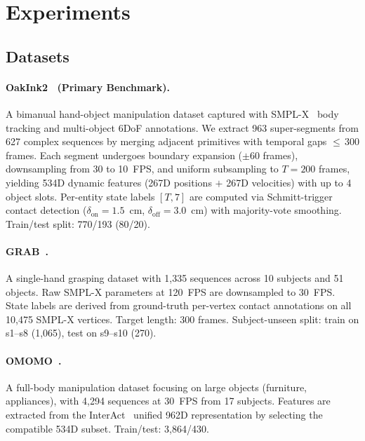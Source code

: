 \section{Experiments}
\label{sec:experiments}

\subsection{Datasets}
\label{sec:datasets}

\paragraph{OakInk2~\cite{zhan2024oakink2} (Primary Benchmark).}
A bimanual hand-object manipulation dataset captured with SMPL-X~\cite{pavlakos2019expressive} body tracking and multi-object 6DoF annotations.
We extract 963 super-segments from 627 complex sequences by merging adjacent primitives with temporal gaps ${\leq}\,300$ frames.
Each segment undergoes boundary expansion (${\pm}60$ frames), downsampling from 30 to 10~FPS, and uniform subsampling to $T{=}200$ frames, yielding 534D dynamic features (267D positions $+$ 267D velocities) with up to 4 object slots.
Per-entity state labels $[T, 7]$ are computed via Schmitt-trigger contact detection ($\delta_\text{on}{=}1.5$~cm, $\delta_\text{off}{=}3.0$~cm) with majority-vote smoothing.
Train/test split: 770/193 (80/20).

\paragraph{GRAB~\cite{taheri2020grab}.}
A single-hand grasping dataset with 1{,}335 sequences across 10 subjects and 51 objects.
Raw SMPL-X parameters at 120~FPS are downsampled to 30~FPS.
State labels are derived from ground-truth per-vertex contact annotations on all 10{,}475 SMPL-X vertices.
Target length: 300 frames.
Subject-unseen split: train on s1--s8 (1{,}065), test on s9--s10 (270).

\paragraph{OMOMO~\cite{li2023omomo}.}
A full-body manipulation dataset focusing on large objects (furniture, appliances), with 4{,}294 sequences at 30~FPS from 17 subjects.
Features are extracted from the InterAct~\cite{xu2025interact} unified 962D representation by selecting the compatible 534D subset.
Train/test: 3{,}864/430.



